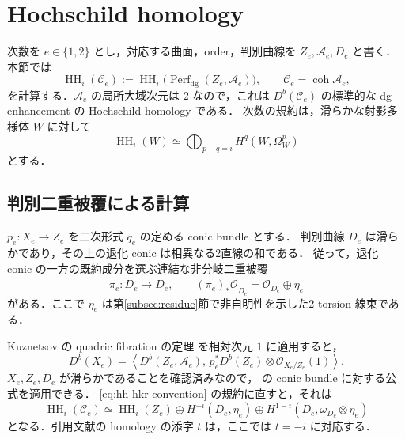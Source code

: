 \section{Hochschild homology}
\label{sec:hochschild}

次数を $e\in\{1,2\}$ とし，対応する曲面，order，判別曲線を
$Z_e,\mathcal A_e,D_e$ と書く．本節では
\[
 \operatorname{HH}_i(\mathcal C_e)
 :=\operatorname{HH}_i\bigl(\operatorname{Perf}_{\mathrm{dg}}(Z_e,\mathcal A_e)\bigr),
 \qquad \mathcal C_e=\operatorname{coh}\mathcal A_e,
\]
を計算する．$\mathcal A_e$ の局所大域次元は $2$ なので，これは
$D^b(\mathcal C_e)$ の標準的な dg enhancement の Hochschild homology である．
次数の規約は，滑らかな射影多様体 $W$ に対して
\begin{equation}
 \operatorname{HH}_i(W)
 \simeq \bigoplus_{p-q=i} H^q(W,\Omega_W^p)
 \label{eq:hh-hkr-convention}
\end{equation}
とする．

\subsection{判別二重被覆による計算}

$p_e:X_e\to Z_e$ を二次形式 $q_e$ の定める conic bundle とする．
判別曲線 $D_e$ は滑らかであり，その上の退化 conic は相異なる2直線の和である．
従って，退化 conic の一方の既約成分を選ぶ連結な非分岐二重被覆
\[
 \pi_e:\widetilde D_e\longrightarrow D_e,
 \qquad
 (\pi_e)_*\mathcal O_{\widetilde D_e}
 =\mathcal O_{D_e}\oplus\eta_e
\]
がある．ここで $\eta_e$ は第\ref{subsec:residue}節で非自明性を示した2-torsion 線束である．

Kuznetsov の quadric fibration の定理
\cite[Theorem~4.2]{KuznetsovQuadric} を相対次元 $1$ に適用すると，
\begin{equation}
 D^b(X_e)
 =\left\langle
 D^b(Z_e,\mathcal A_e),\,
 p_e^*D^b(Z_e)\otimes\mathcal O_{X_e/Z_e}(1)
 \right\rangle .
 \label{eq:hh-conic-sod}
\end{equation}
$X_e,Z_e,D_e$ が滑らかであることを確認済みなので，
\cite[Theorem~8.12]{KuznetsovHH} の conic bundle に対する公式を適用できる．
\eqref{eq:hh-hkr-convention} の規約に直すと，それは
\begin{equation}
 \operatorname{HH}_i(\mathcal C_e)
 \simeq \operatorname{HH}_i(Z_e)
 \oplus H^{-i}(D_e,\eta_e)
 \oplus H^{1-i}(D_e,\omega_{D_e}\otimes\eta_e)
 \label{eq:hh-discriminant-formula}
\end{equation}
となる．引用文献の homology の添字 $t$ は，ここでは $t=-i$ に対応する．

